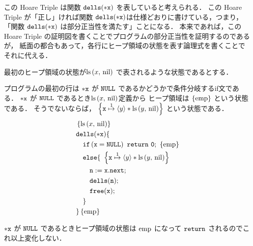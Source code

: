 \documentclass[a4paper, 10pt]{ltjsarticle}
\begin{document}
  この Hoare Triple は関数 $\mathtt{dells(*x)}$ を表していると考えられる．
  この Hoare Triple が「正し」ければ関数 $\mathtt{dells(*x)}$は仕様どおりに書けている，つまり，
  「関数 $\mathtt{dells(*x)}$ は部分正当性を満たす」ことになる．
  本来であれば，この Hoare Triple の証明図を書くことでプログラムの部分正当性を証明するのであるが，
  紙面の都合もあって，各行にヒープ領域の状態を表す論理式を書くことでそれに代える．
  
  最初のヒープ領域の状態が$\mathop{\mathrm{ls}}\left(x{,}\ \mathrm{nil}\right)$
  で表されるような状態であるとする．

  プログラムの最初の行は $\mathtt{*x}$ が
  $\mathtt{NULL}$ であるかどうかで条件分岐するif文である．
  $\mathtt{*x}$ が $\mathtt{NULL}$ であるとき$\mathop{\mathrm{ls}}\left(x{,}\ \mathrm{nil}\right)$定義から
  ヒープ領域は $\left\{\mathrm{emp}\right\}$ という状態である．
  そうでないならば，
  $\left\{\mathtt{x} \mathrel{\overset{1}{\mapsto}} \left\langle y \right\rangle * \mathop{\mathrm{ls}}\left(y{,}\ \mathrm{nil}\right)\right\}$
  という状態である．
  \begin{align*}
   &  \left\{\mathprls{x}{\mathvalnil}\right\}\\
   & \mathprogramsy{dells(*x)} \{  \\
   &\quad \mathprogramsy{if\left(x = NULL\right)\ return\ 0;}\ \left\{\mathemp\right\}
   \\
     &\quad   \mathprogramsy{else \{}\  
   \left\{ \mathprogramsy{x} \mathpointer{1} \left\langle y \right\rangle * \mathprls{y}{\mathvalnil}  \right\} \\
     &\qquad  \mathprogramsy{n := x.next;}  %
   \\
     &\qquad  \mathprogramsy{dells(n);}  %
   \\
      &\qquad  \mathprogramsy{free(x);}   %
   \\
      &\quad \mathprogramsy{\}} %
   \\
      &\mathprogramsy{\}} \left\{\mathemp\right\}
  \end{align*}

  $\mathtt{*x}$ が $\mathtt{NULL}$ であるときヒープ領域の状態は $\mathrm{emp}$ になって 
  $\mathtt{return}$ されるのでこれ以上変化しない．
\end{document}
